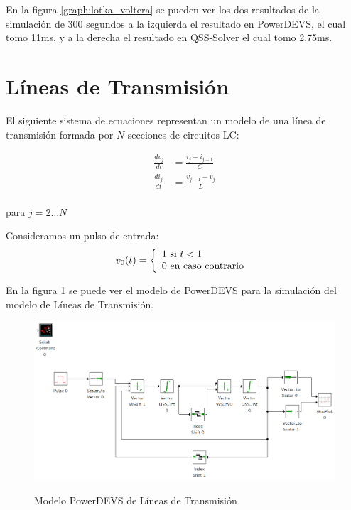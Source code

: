 En la figura \ref{graph:lotka_voltera} se pueden ver los dos resultados de la simulación de 300 segundos a la izquierda el resultado en PowerDEVS, el cual tomo 11ms,
y a la derecha el resultado en QSS-Solver el cual tomo 2.75ms.

\section{Líneas de Transmisión}
	El siguiente sistema de ecuaciones representan un modelo de una línea de transmisión formada por $N$ secciones de circuitos LC:

\begin{equation}
\begin{split}
\frac{d v_{j}}{d t} &= \frac{i_{j} - i_{j+1}}{C} \\
\frac{d i_{j}}{d t} &= \frac{v_{j-1} - v_{j}}{L} \\	
\end{split}
\end{equation}

para $j = 2 \dots N$

Consideramos un pulso de entrada:
\begin{equation}
v_0(t) = \left\{ 
  \begin{array}{l l}
    1 \text{ si } t < 1 \\
    0 \text{ en caso contrario }
  \end{array} \right.
\end{equation}

En la figura \ref{model:lclines} se puede ver el modelo de PowerDEVS para la simulación del modelo de Líneas de Transmisión.

\begin{figure}[H]
 \includegraphics[width=0.75\linewidth]{lclines}
\label{model:lclines}
\caption{Modelo PowerDEVS de Líneas de Transmisión}
\end{figure}

